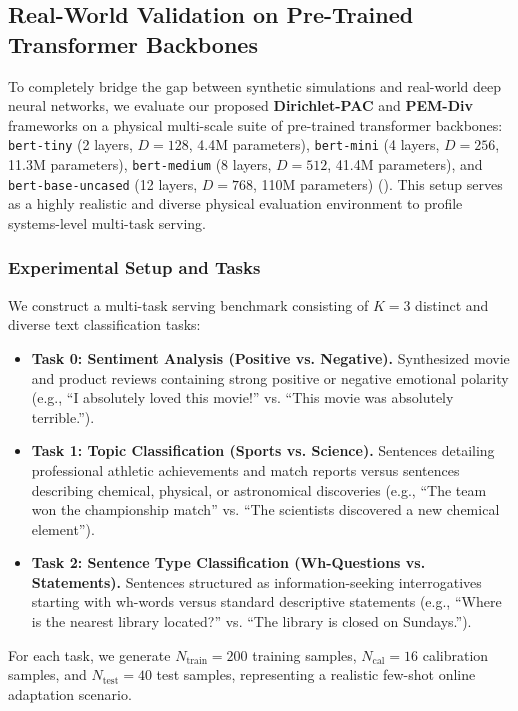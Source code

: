 \subsection{Real-World Validation on Pre-Trained Transformer Backbones}
To completely bridge the gap between synthetic simulations and real-world deep neural networks, we evaluate our proposed \textbf{Dirichlet-PAC} and \textbf{PEM-Div} frameworks on a physical multi-scale suite of pre-trained transformer backbones: \texttt{bert-tiny} (2 layers, $D=128$, 4.4M parameters), \texttt{bert-mini} (4 layers, $D=256$, 11.3M parameters), \texttt{bert-medium} (8 layers, $D=512$, 41.4M parameters), and \texttt{bert-base-uncased} (12 layers, $D=768$, 110M parameters) (\cite{prajjwal2020bert}). This setup serves as a highly realistic and diverse physical evaluation environment to profile systems-level multi-task serving.

\subsubsection{Experimental Setup and Tasks}
We construct a multi-task serving benchmark consisting of $K=3$ distinct and diverse text classification tasks:
\begin{itemize}
    \item \textbf{Task 0: Sentiment Analysis (Positive vs. Negative).} Synthesized movie and product reviews containing strong positive or negative emotional polarity (e.g., ``I absolutely loved this movie!'' vs. ``This movie was absolutely terrible.'').
    \item \textbf{Task 1: Topic Classification (Sports vs. Science).} Sentences detailing professional athletic achievements and match reports versus sentences describing chemical, physical, or astronomical discoveries (e.g., ``The team won the championship match'' vs. ``The scientists discovered a new chemical element'').
    \item \textbf{Task 2: Sentence Type Classification (Wh-Questions vs. Statements).} Sentences structured as information-seeking interrogatives starting with wh-words versus standard descriptive statements (e.g., ``Where is the nearest library located?'' vs. ``The library is closed on Sundays.'').
\end{itemize}
For each task, we generate $N_{\text{train}} = 200$ training samples, $N_{\text{cal}} = 16$ calibration samples, and $N_{\text{test}} = 40$ test samples, representing a realistic few-shot online adaptation scenario.

